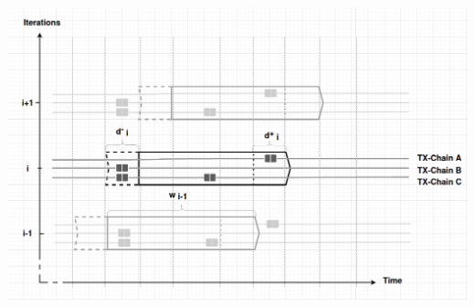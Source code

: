 


% 	

\begin{center}
    \includegraphics[width=1\linewidth]{fig/iterations_general}%
  \label{fig:aggr}
\end{center}




